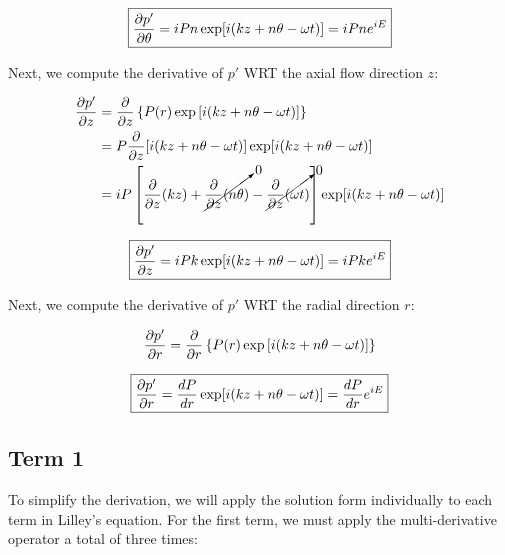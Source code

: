 \documentclass[]{aiaa-tc}%
\begin{document}
\begin{equation} \label{dpdtheta}
\boxed{\dfrac{\partial p'}{\partial \theta} = iPn \exp[i(kz + n\theta -\omega t)] = iPn e^{iE} }
\end{equation}


Next, we compute the derivative of $p'$ WRT the axial flow direction $z$:



\begin{align*}
\dfrac{\partial p'}{\partial z} &= \dfrac{\partial}{\partial z}
  \left\{ P(r) \exp\left[ i(kz + n\theta -\omega t) \right]\right\} \\
&= P \dfrac{\partial}{\partial z} [i(kz + n\theta -\omega t)] \exp[i(kz + n\theta -\omega t)] \\
&= iP \left[             \dfrac{\partial}{\partial z}(kz)
          + \cancelto{0}{\dfrac{\partial}{\partial z}(n\theta)}
          - \cancelto{0}{\dfrac{\partial}{\partial z}(\omega t)}
    \right] \exp[i(kz + n\theta -\omega t)] \\
\end{align*}

\begin{equation} \label{dpdz}
\boxed{\dfrac{\partial p'}{\partial z} = iPk \exp[i(kz + n\theta -\omega t)] = iPk e^{iE} }
\end{equation}


Next, we compute the derivative of $p'$ WRT the radial direction $r$:

\begin{align*}
\dfrac{\partial p'}{\partial r} &= \dfrac{\partial}{\partial r}
  \left\{ P(r) \exp\left[ i(kz + n\theta -\omega t) \right]\right\} \\
\end{align*}

\begin{equation} \label{dpdr}
\boxed{\dfrac{\partial p'}{\partial r} = \dfrac{dP}{dr} \exp[i(kz + n\theta -\omega t)] = \dfrac{dP}{dr} e^{iE} }
\end{equation}



\subsection{Term 1}

To simplify the derivation, we will apply the solution form individually to each term in Lilley's equation.  For the first term, we must apply the multi-derivative operator a total of three times:

\end{document}
